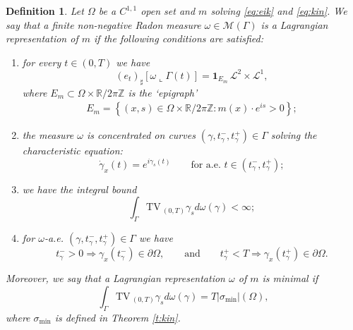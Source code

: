 \documentclass[fleqn
]{article}
\numberwithin{equation}{section}
\newcommand{\R}{{\mathbb R}}
\newcommand{\Z}{{\mathbb Z}}
\renewcommand{\L}{{\mathcal L}}
\newcommand{\TV}{{\mathrm{TV}\,}}
\newtheorem{definition}{Definition}
\theoremstyle{definition}
\begin{document}
\begin{definition}\label{D_Lagr}
Let $\Omega$ be a $C^{1,1}$ open set and $m$ solving \eqref{eq:eik} and \eqref{eq:kin}.
We say that a finite non-negative Radon measure $\omega \in \mathcal M( \Gamma)$ is a \emph{Lagrangian representation} of $m$ if the following conditions are satisfied:
\begin{enumerate}
\item for every $t\in (0,T)$ we have
\begin{equation}\label{E_repr_formula}
( e_t)_\sharp \left[ \omega \llcorner  \Gamma(t)\right]= \mathbf 1_{E_m}\, \L^{2}\times \L^1,
\end{equation}
where $E_m\subset\Omega\times\R/2\pi\Z$ is the `epigraph'
\begin{align*}
E_m=\left\lbrace (x,s)\in\Omega\times\R/2\pi\Z\colon m(x)\cdot e^{is}> 0\right\rbrace;
\end{align*}
\item the measure $\omega$ is concentrated on curves $(\gamma,t^-_\gamma,t^+_\gamma)\in  \Gamma$ solving the characteristic equation:
\begin{equation}\label{e:charac}
\dot\gamma_x(t)= e^{i \gamma_s(t)}\qquad\text{for a.e. }t\in (t^-_\gamma,t^+_\gamma);
\end{equation}
\item we have the integral bound
\begin{equation*}\label{E_reg}
\int_{ \Gamma} \TV_{(0,T)} \gamma_s d\omega(\gamma) <\infty;
\end{equation*}
\item for $\omega$-a.e. $(\gamma,t^-_\gamma,t^+_\gamma)\in \Gamma$ we have
\begin{equation}\label{e:extreme_time}
t^-_\gamma>0 \Rightarrow  \gamma_x(t^-_\gamma ) \in \partial \Omega, \qquad \mbox{and} \qquad 
t^+_\gamma<T \Rightarrow  \gamma_x(t^+_\gamma) \in \partial \Omega.
\end{equation}
\end{enumerate}
Moreover, we say that a Lagrangian representation $\omega$ of $m$ is minimal if
\[
\int_{ \Gamma} \TV_{(0,T)} \gamma_s d\omega(\gamma) = T |\sigma_{\min}|(\Omega),
\]
where $\sigma_{\min}$ is defined in Theorem \ref{t:kin}.
\end{definition}
\end{document}

